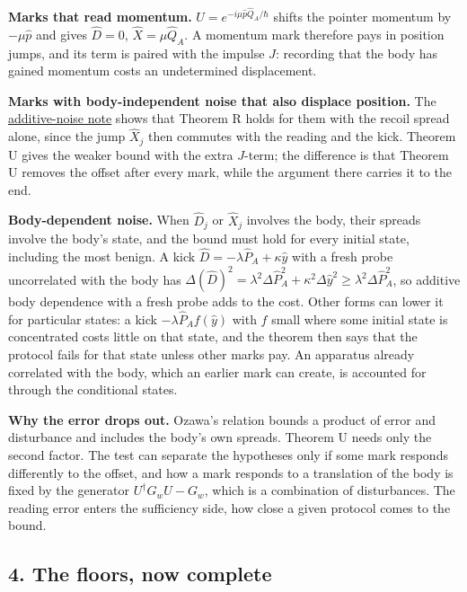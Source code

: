 \documentclass[11pt,a4paper]{article}
\begin{document}
\textbf{Marks that read momentum.} \(U=e^{-i\mu\hat p\hat Q_A/\hbar}\)
shifts the pointer momentum by \(-\mu\hat p\) and gives \(\hat D=0\),
\(\hat X=\mu\hat Q_A\). A momentum mark therefore pays in position
jumps, and its term is paired with the impulse \(J\): recording that the
body has gained momentum costs an undetermined displacement.

\textbf{Marks with body-independent noise that also displace position.}
The \href{additive-noise-marks.md}{additive-noise note} shows that
Theorem R holds for them with the recoil spread alone, since the jump
\(\hat X_j\) then commutes with the reading and the kick. Theorem U
gives the weaker bound with the extra \(J\)-term; the difference is that
Theorem U removes the offset after every mark, while the argument there
carries it to the end.

\textbf{Body-dependent noise.} When \(\hat D_j\) or \(\hat X_j\)
involves the body, their spreads involve the body's state, and the bound
must hold for every initial state, including the most benign. A kick
\(\hat D=-\lambda\hat P_A+\kappa\hat y\) with a fresh probe uncorrelated
with the body has
\(\Delta(\hat D)^2=\lambda^2\Delta\hat P_A^2+\kappa^2\Delta\hat y^2\ge\lambda^2\Delta\hat P_A^2\),
so additive body dependence with a fresh probe adds to the cost. Other
forms can lower it for particular states: a kick
\(-\lambda\hat P_Af(\hat y)\) with \(f\) small where some initial state
is concentrated costs little on that state, and the theorem then says
that the protocol fails for that state unless other marks pay. An
apparatus already correlated with the body, which an earlier mark can
create, is accounted for through the conditional states.

\textbf{Why the error drops out.} Ozawa's relation bounds a product of
error and disturbance and includes the body's own spreads. Theorem U
needs only the second factor. The test can separate the hypotheses only
if some mark responds differently to the offset, and how a mark responds
to a translation of the body is fixed by the generator
\(U^\dagger G_wU-G_w\), which is a combination of disturbances. The
reading error enters the sufficiency side, how close a given protocol
comes to the bound.

\hypertarget{the-floors-now-complete}{%
\subsection{4. The floors, now complete}\label{the-floors-now-complete}}
\end{document}
